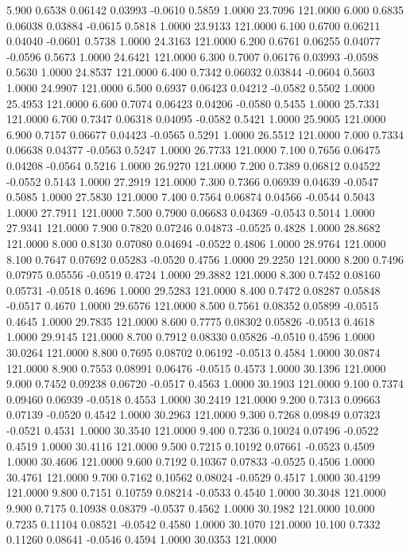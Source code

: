    5.900   0.6538   0.06142   0.03993  -0.0610   0.5859   1.0000  23.7096 121.0000
   6.000   0.6835   0.06038   0.03884  -0.0615   0.5818   1.0000  23.9133 121.0000
   6.100   0.6700   0.06211   0.04040  -0.0601   0.5738   1.0000  24.3163 121.0000
   6.200   0.6761   0.06255   0.04077  -0.0596   0.5673   1.0000  24.6421 121.0000
   6.300   0.7007   0.06176   0.03993  -0.0598   0.5630   1.0000  24.8537 121.0000
   6.400   0.7342   0.06032   0.03844  -0.0604   0.5603   1.0000  24.9907 121.0000
   6.500   0.6937   0.06423   0.04212  -0.0582   0.5502   1.0000  25.4953 121.0000
   6.600   0.7074   0.06423   0.04206  -0.0580   0.5455   1.0000  25.7331 121.0000
   6.700   0.7347   0.06318   0.04095  -0.0582   0.5421   1.0000  25.9005 121.0000
   6.900   0.7157   0.06677   0.04423  -0.0565   0.5291   1.0000  26.5512 121.0000
   7.000   0.7334   0.06638   0.04377  -0.0563   0.5247   1.0000  26.7733 121.0000
   7.100   0.7656   0.06475   0.04208  -0.0564   0.5216   1.0000  26.9270 121.0000
   7.200   0.7389   0.06812   0.04522  -0.0552   0.5143   1.0000  27.2919 121.0000
   7.300   0.7366   0.06939   0.04639  -0.0547   0.5085   1.0000  27.5830 121.0000
   7.400   0.7564   0.06874   0.04566  -0.0544   0.5043   1.0000  27.7911 121.0000
   7.500   0.7900   0.06683   0.04369  -0.0543   0.5014   1.0000  27.9341 121.0000
   7.900   0.7820   0.07246   0.04873  -0.0525   0.4828   1.0000  28.8682 121.0000
   8.000   0.8130   0.07080   0.04694  -0.0522   0.4806   1.0000  28.9764 121.0000
   8.100   0.7647   0.07692   0.05283  -0.0520   0.4756   1.0000  29.2250 121.0000
   8.200   0.7496   0.07975   0.05556  -0.0519   0.4724   1.0000  29.3882 121.0000
   8.300   0.7452   0.08160   0.05731  -0.0518   0.4696   1.0000  29.5283 121.0000
   8.400   0.7472   0.08287   0.05848  -0.0517   0.4670   1.0000  29.6576 121.0000
   8.500   0.7561   0.08352   0.05899  -0.0515   0.4645   1.0000  29.7835 121.0000
   8.600   0.7775   0.08302   0.05826  -0.0513   0.4618   1.0000  29.9145 121.0000
   8.700   0.7912   0.08330   0.05826  -0.0510   0.4596   1.0000  30.0264 121.0000
   8.800   0.7695   0.08702   0.06192  -0.0513   0.4584   1.0000  30.0874 121.0000
   8.900   0.7553   0.08991   0.06476  -0.0515   0.4573   1.0000  30.1396 121.0000
   9.000   0.7452   0.09238   0.06720  -0.0517   0.4563   1.0000  30.1903 121.0000
   9.100   0.7374   0.09460   0.06939  -0.0518   0.4553   1.0000  30.2419 121.0000
   9.200   0.7313   0.09663   0.07139  -0.0520   0.4542   1.0000  30.2963 121.0000
   9.300   0.7268   0.09849   0.07323  -0.0521   0.4531   1.0000  30.3540 121.0000
   9.400   0.7236   0.10024   0.07496  -0.0522   0.4519   1.0000  30.4116 121.0000
   9.500   0.7215   0.10192   0.07661  -0.0523   0.4509   1.0000  30.4606 121.0000
   9.600   0.7192   0.10367   0.07833  -0.0525   0.4506   1.0000  30.4761 121.0000
   9.700   0.7162   0.10562   0.08024  -0.0529   0.4517   1.0000  30.4199 121.0000
   9.800   0.7151   0.10759   0.08214  -0.0533   0.4540   1.0000  30.3048 121.0000
   9.900   0.7175   0.10938   0.08379  -0.0537   0.4562   1.0000  30.1982 121.0000
  10.000   0.7235   0.11104   0.08521  -0.0542   0.4580   1.0000  30.1070 121.0000
  10.100   0.7332   0.11260   0.08641  -0.0546   0.4594   1.0000  30.0353 121.0000
